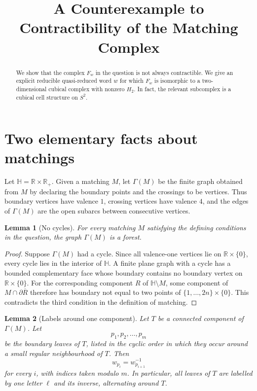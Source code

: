 \documentclass[11pt]{article}
\title{A Counterexample to Contractibility of the Matching Complex}
\author{}
\date{}
\newtheorem{lemma}{Lemma}
\newcommand{\HH}{\mathbb H}
\newcommand{\bd}{\partial}
\begin{document}
\maketitle

\begin{abstract}
We show that the complex \(F_w\) in the question is not always contractible.  We give an explicit reducible quasi-reduced word \(w\) for which \(F_w\) is isomorphic to a two-dimensional cubical complex with nonzero \(H_2\).  In fact, the relevant subcomplex is a cubical cell structure on \(S^2\).
\end{abstract}

\section{Two elementary facts about matchings}

Let \(\HH=\mathbb R\times \mathbb R_+\).  Given a matching \(M\), let \(\Gamma(M)\) be the finite graph obtained from \(M\) by declaring the boundary points and the crossings to be vertices.  Thus boundary vertices have valence \(1\), crossing vertices have valence \(4\), and the edges of \(\Gamma(M)\) are the open subarcs between consecutive vertices.

\begin{lemma}[No cycles]\label{lem:forest}
For every matching \(M\) satisfying the defining conditions in the question, the graph \(\Gamma(M)\) is a forest.
\end{lemma}

\begin{proof}
Suppose \(\Gamma(M)\) had a cycle.  Since all valence-one vertices lie on \(\mathbb R\times\{0\}\), every cycle lies in the interior of \(\HH\).  A finite plane graph with a cycle has a bounded complementary face whose boundary contains no boundary vertex on \(\mathbb R\times\{0\}\).  For the corresponding component \(R\) of \(\HH\setminus M\), some component of \(M\cap \bd \overline R\) therefore has boundary not equal to two points of \(\{1,\dots,2n\}\times\{0\}\).  This contradicts the third condition in the definition of matching.
\end{proof}

\begin{lemma}[Labels around one component]\label{lem:cycliclabels}
Let \(T\) be a connected component of \(\Gamma(M)\).  Let
\[
p_1,p_2,\dots,p_m
\]
be the boundary leaves of \(T\), listed in the cyclic order in which they occur around a small regular neighbourhood of \(T\).  Then
\[
w_{p_i}=w_{p_{i+1}}^{-1}
\]
for every \(i\), with indices taken modulo \(m\).  In particular, all leaves of \(T\) are labelled by one letter \(\ell\) and its inverse, alternating around \(T\).
\end{lemma}
\end{document}
